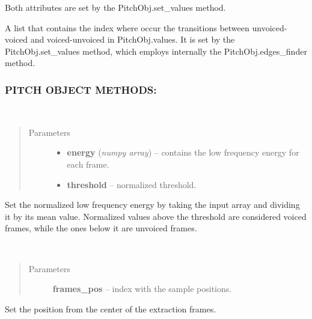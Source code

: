 \documentclass[letterpaper,10pt,english]{sphinxmanual}
\begin{document}
Both attributes are set by the PitchObj.set\_values method.

\begin{fulllineitems}
\label{pYAAPT:PitchObj.edges}
A list that contains the index where occur the transitions between unvoiced-voiced and voiced-unvoiced in PitchObj.values. It is set by the PitchObj.set\_values method, which employs internally the PitchObj.edges\_finder method.

\end{fulllineitems}



\subsubsection{PITCH OBJECT METHODS:}
\label{pYAAPT:pitch-object-methods}

\begin{fulllineitems}
\label{pYAAPT:PitchObj.set_energy}~\begin{quote}\begin{description}
\item[{Parameters}] \leavevmode\begin{itemize}
\item {} 
\textbf{energy} (\emph{numpy array}) -- contains the low frequency energy for each frame.

\item {} 
\textbf{threshold} -- normalized threshold.

\end{itemize}

\end{description}\end{quote}

Set the normalized low frequency energy by taking the input array and dividing it by its mean value. Normalized values above the threshold are considered voiced frames, while the ones below it are unvoiced frames.

\end{fulllineitems}


\begin{fulllineitems}
\label{pYAAPT:PitchObj.set_frames_pos}~\begin{quote}\begin{description}
\item[{Parameters}] \leavevmode
\textbf{frames\_pos} -- index with the sample positions.

\end{description}\end{quote}

Set the position from the center of the extraction frames.

\end{fulllineitems}
\end{document}

